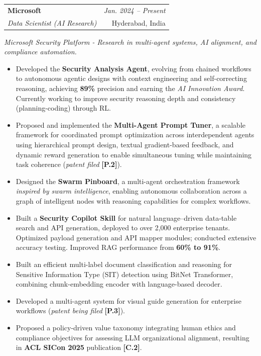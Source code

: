 \documentclass[a4paper,11pt]{article}
\makeatletter
\newcommand{\resumeSubheading}[4]{
\vspace{0.5mm}\item
    \begin{tabular*}{0.98\textwidth}[t]{l@{\extracolsep{\fill}}r}
        \textbf{#1} & \textit{\footnotesize{#4}} \\
        \textit{\footnotesize{#3}} &  \footnotesize{#2}\\
    \end{tabular*}
    \vspace{-2.4mm}
}
\newcommand{\resumeItemListStart}{\begin{itemize}[leftmargin=*,labelsep=1mm,itemsep=0.5mm]}
\newcommand{\resumeItemListEnd}{\end{itemize}\vspace{-2mm}}
\makeatother
\begin{document}
\resumeSubheading
{Microsoft}{Hyderabad, India}
{Data Scientist (AI Research)}{Jan. 2024 -- Present}
\textit{Microsoft Security Platform - Research in multi-agent systems, AI alignment, and compliance automation.}
\resumeItemListStart
  \item Developed the \textbf{Security Analysis Agent}, evolving from chained workflows to autonomous agentic designs with context engineering and self-correcting reasoning, achieving \textbf{89\%} precision and earning the \textit{AI Innovation Award}. Currently working to improve security reasoning depth and consistency (planning-coding) through RL.
  \item Proposed and implemented the \textbf{Multi-Agent Prompt Tuner}, a scalable framework for coordinated prompt optimization across interdependent agents using hierarchical prompt design, textual gradient-based feedback, and dynamic reward generation to enable simultaneous tuning while maintaining task coherence (\textit{patent filed} \textbf{[P.2]}).  \item Designed the \textbf{Swarm Pinboard}, a multi-agent orchestration framework \textit{inspired by swarm intelligence}, enabling autonomous collaboration across a graph of intelligent nodes with reasoning capabilities for complex workflows.
  \item Built a \textbf{Security Copilot Skill} for natural language–driven data-table search and API generation, deployed to over 2,000 enterprise tenants. Optimized payload generation and API mapper modules; conducted extensive accuracy testing. Improved RAG performance from \textbf{60\% to 91\%}.

\item Built an efficient multi-label document classification and reasoning for Sensitive Information Type (SIT) detection using BitNet Transformer, combining chunk-embedding encoder with language-based decoder.
  
  \item Developed a multi-agent system for visual guide generation for enterprise workflows (\textit{patent being filed} \textbf{[P.3]}).
  \item Proposed a policy-driven value taxonomy integrating human ethics and compliance objectives for assessing LLM organizational alignment, resulting in \textbf{ACL SICon 2025} publication \textbf{[C.2]}.
\resumeItemListEnd
\end{document}
